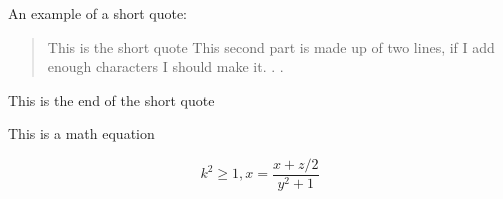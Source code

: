 An example of a short quote:
\begin{quote}
This is the short quote This second part is made up of two lines, if
I add enough characters I should make it. . .
\end{quote}

This is the end of the short quote

This is a math equation

\begin{equation}
k^2 \geq 1,
x = \frac{x + z/2}{y^2 +1}
\end{equation}